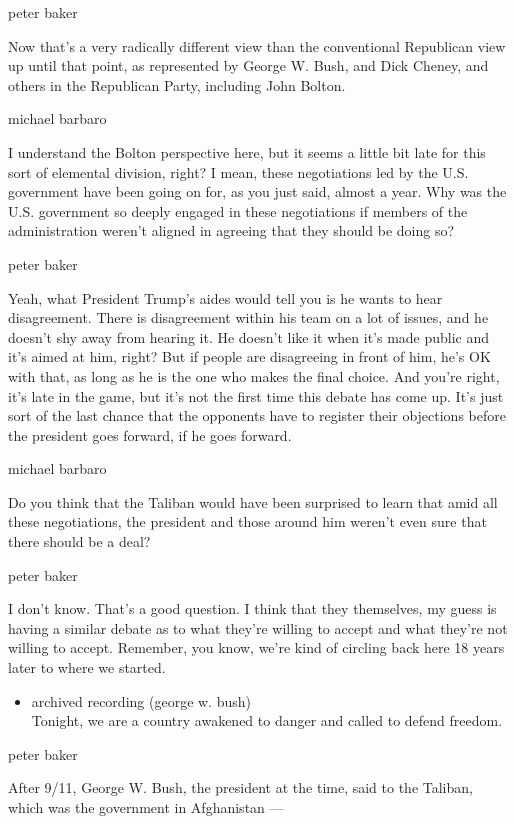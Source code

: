 peter baker

Now that's a very radically different view than the conventional
Republican view up until that point, as represented by George W. Bush,
and Dick Cheney, and others in the Republican Party, including John
Bolton.

michael barbaro

I understand the Bolton perspective here, but it seems a little bit late
for this sort of elemental division, right? I mean, these negotiations
led by the U.S. government have been going on for, as you just said,
almost a year. Why was the U.S. government so deeply engaged in these
negotiations if members of the administration weren't aligned in
agreeing that they should be doing so?

peter baker

Yeah, what President Trump's aides would tell you is he wants to hear
disagreement. There is disagreement within his team on a lot of issues,
and he doesn't shy away from hearing it. He doesn't like it when it's
made public and it's aimed at him, right? But if people are disagreeing
in front of him, he's OK with that, as long as he is the one who makes
the final choice. And you're right, it's late in the game, but it's not
the first time this debate has come up. It's just sort of the last
chance that the opponents have to register their objections before the
president goes forward, if he goes forward.

michael barbaro

Do you think that the Taliban would have been surprised to learn that
amid all these negotiations, the president and those around him weren't
even sure that there should be a deal?

peter baker

I don't know. That's a good question. I think that they themselves, my
guess is having a similar debate as to what they're willing to accept
and what they're not willing to accept. Remember, you know, we're kind
of circling back here 18 years later to where we started.

\begin{itemize}
\tightlist
\item
  archived recording (george w. bush)\\
  Tonight, we are a country awakened to danger and called to defend
  freedom.
\end{itemize}

peter baker

After 9/11, George W. Bush, the president at the time, said to the
Taliban, which was the government in Afghanistan ---

